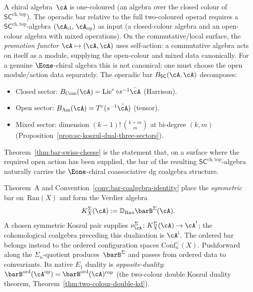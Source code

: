\begin{construction}
\label{constr:promotion-functor}
A chiral algebra~$\cA$ is one-coloured (an algebra over the
closed colour of~$\mathsf{SC}^{\mathrm{ch,top}}$). The operadic
bar relative to the full two-coloured operad requires a
$\mathsf{SC}^{\mathrm{ch,top}}$-algebra
$(\cA_{\mathrm{cl}},\, \cA_{\mathrm{op}})$ as input
(a closed-colour algebra and an open-colour algebra with
mixed operations). On the commutative/local surface, the
\emph{promotion functor} $\cA \mapsto (\cA, \cA)$ uses
self-action: a commutative algebra acts on itself as a module,
supplying the open-colour and mixed data canonically. For a genuine
$\Eone$-chiral algebra this is not canonical; one must choose the
open module/action data separately. The operadic bar
$B_{\mathsf{SC}}(\cA, \cA)$ decomposes:
\begin{itemize}
\item Closed sector: $B_{\operatorname{Com}}(\cA)
 = \operatorname{Lie}^c \circ s^{-1}\bar{\cA}$ (Harrison).
\item Open sector: $B_{\operatorname{Ass}}(\cA)
 = T^c(s^{-1}\bar{\cA})$ (tensor).
\item Mixed sector: dimension $(k{-}1)!\,\binom{k+m}{m}$
 at bi-degree $(k,m)$
 (Proposition~\textup{\ref{prop:sc-koszul-dual-three-sectors}}).
\end{itemize}
Theorem~\textup{\ref{thm:bar-swiss-cheese}} is the statement that,
on a surface where the required open action has been supplied, the bar
of the resulting $\mathsf{SC}^{\mathrm{ch,top}}$-algebra
naturally carries the $\Eone$-chiral coassociative dg coalgebra structure.
\end{construction}

\begin{remark}
\label{rem:ordered-verdier-nonexistence}
Theorem~A and
Convention~\textup{\ref{conv:bar-coalgebra-identity}} place the
\emph{symmetric} bar on~$\mathrm{Ran}(X)$ and form the Verdier algebra
\[
K_X^{\Sigma}(\cA):=
\mathbb{D}_{\mathrm{Ran}}\barB^{\Sigma}(\cA).
\]
A chosen symmetric Koszul pair supplies
$\nu_\cA^{\Sigma}\colon K_X^{\Sigma}(\cA)\to\cA^!$; the
cohomological coalgebra preceding this dualization is
$\cA^{\mathrm{i}}$.  The ordered bar belongs instead to the ordered
configuration spaces $\mathrm{Conf}_n^{<}(X)$.  Pushforward along the
$\Sigma_n$-quotient produces~$\barB^{\Sigma}$ and passes from ordered
data to coinvariants.  Its native $E_1$ duality is
\emph{opposite-duality}:
$\barB^{\mathrm{ord}}(\cA^{\mathrm{op}})
= \barB^{\mathrm{ord}}(\cA)^{\mathrm{cop}}$
(the two-colour double Koszul duality theorem,
Theorem~\textup{\ref{thm:two-colour-double-kd}}).
\end{remark}

